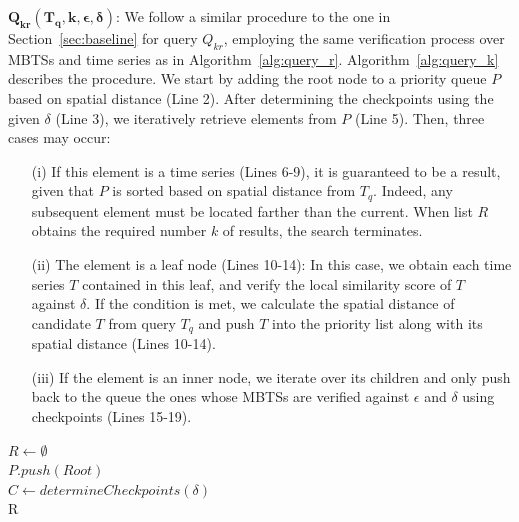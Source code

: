\noindent $\mathbold{Q_{kr}(T_q, k, \epsilon, \delta)}$: We follow a similar procedure to the one in Section~\ref{sec:baseline} for query $Q_{kr}$, employing the same verification process over MBTSs and time series as in Algorithm~\ref{alg:query_r}. Algorithm~\ref{alg:query_k} describes the procedure. We start by adding the root node to a priority queue $P$ based on spatial distance (Line 2). After determining the checkpoints using the given $\delta$ (Line 3), we iteratively retrieve elements from $P$ (Line 5). Then, three cases may occur: 
\begin{enumerate}
\item[(i)] If this element is a time series (Lines 6-9), it is guaranteed to be a result, given that $P$ is sorted based on spatial distance from $T_q$. Indeed, any subsequent element must be located farther than the current. When list $R$ obtains the required number $k$ of results, the search terminates. 
\item[(ii)] The element is a leaf node (Lines 10-14): In this case, we obtain each time series $T$ contained in this leaf, and verify the local similarity score of $T$ against $\delta$. If the condition is met, we calculate the spatial distance of candidate $T$ from query $T_q$ and push $T$ into the priority list along with its spatial distance (Lines 10-14). 
\item[(iii)] If the element is an inner node, we iterate over its children and only push back to the queue the ones whose MBTSs are verified against $\epsilon$ and $\delta$ using checkpoints (Lines 15-19).
\end{enumerate}

\SetAlFnt{\small}
\begin{algorithm}[!t]
    \DontPrintSemicolon
    $R \leftarrow \emptyset$ \\
    $P.push(Root)$ \\
    $C \leftarrow determineCheckpoints(\delta)$ \\
    \KwRet R
    \caption{$Q_{kr}(T_q, k, \epsilon, \delta)$}
    \label{alg:query_k} 
\end{algorithm}

